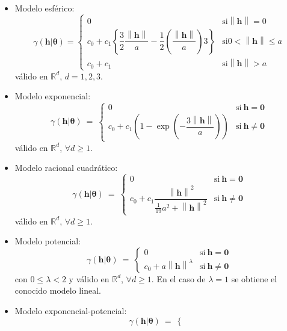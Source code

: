 \documentclass[
  spanish,
]{book}
\theoremstyle{break}
\theoremstyle{definition}
\theoremstyle{definition}
\theoremstyle{definition}
\theoremstyle{definition}
\theoremstyle{remark}
\begin{document}
\begin{itemize}
\item
  Modelo esférico:
  \[\gamma(\mathbf{h}\left| \boldsymbol{\theta}\right. ) = \left\{ 
  \begin{array}{ll}
  0 & \text{si} \left\| \mathbf{h}\right\| =0 \\
  c_0 +c_1 \left\{ \dfrac{3}{2} \dfrac{\left\| \mathbf{h}\right\| }{a}
  -\dfrac{1}{2} \left( \dfrac{\left\| \mathbf{h}\right\| }{a} \right)
  3\right\}  & \text{si} 0<\left\| \mathbf{h}\right\| \leq a \\
  c_0 +c_1  & \text{si} \left\| \mathbf{h}\right\| >a
  \end{array}
  \right.\]
  válido en \(\mathbb{R}^{d}\), \(d=1,2,3\).
\item
  Modelo exponencial:
  \[\gamma(\mathbf{h}\left| \boldsymbol{\theta}\right. )\ =\ \left\{ 
  \begin{array}{ll}
  0 & \text{si}\  \mathbf{h}=\mathbf{0} \\
  c_0 + c_1 \left( 1-\exp \left( -\dfrac{3\left\|
  \mathbf{h}\right\| }{a} \right) \right)  & \text{si}\  \mathbf{h}\neq
  \mathbf{0}
  \end{array}
  \right.\]
  válido en \(\mathbb{R}^{d}\), \(\forall d \geq 1\).
\item
  Modelo racional cuadrático:
  \[\gamma(\mathbf{h}\left| \boldsymbol{\theta}\right. )\ =\ \left\{ 
  \begin{array}{ll}
  0 & \text{si}\  \mathbf{h}=\mathbf{0} \\
  c_0 + c_1 \dfrac{\left\| \mathbf{h}\right\|^2
  }{\frac{1}{19} a^2 +\left\| \mathbf{h}\right\|^2 }  & \text{si}\ 
  \mathbf{h}\neq \mathbf{0}
  \end{array}
  \right.\]
  válido en \(\mathbb{R}^{d}\), \(\forall d \geq 1\).
\item
  Modelo potencial:
  \[\gamma(\mathbf{h}\left| \boldsymbol{\theta}\right. )\ =\ \left\{ 
  \begin{array}{ll}
  0 & \text{si}\  \mathbf{h}=\mathbf{0} \\
  c_0 + a\left\| \mathbf{h}\right\|^{\lambda }  & \text{si}\ 
  \mathbf{h}\neq \mathbf{0}
  \end{array}
  \right.\]
  con \(0\leq \lambda <2\) y válido en \(\mathbb{R}^{d}\), \(\forall d \geq 1\).
  En el caso de \(\lambda =1\) se obtiene el conocido modelo lineal.
\item
  Modelo exponencial-potencial:
  \[\gamma(\mathbf{h}\left| \boldsymbol{\theta}\right. )\ =\ \left\{ 
  \begin{array}{ll}

\end{array}\]
\end{itemize}
\end{document}
